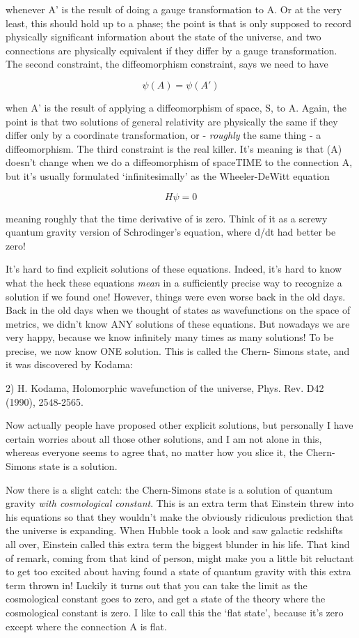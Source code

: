 whenever A' is the result of doing a gauge transformation to A.
Or at the very least, this should hold up to a phase; the point is
that \psi  is only supposed to record physically significant information
about the state of the universe, and two connections are physically
equivalent if they differ by a gauge transformation.  The second
constraint, the diffeomorphism constraint, says we need to have

$$
                     \psi (A) = \psi (A')
$$
    

when A' is the result of applying a diffeomorphism of space, S, to A.
Again, the point is that two solutions of general relativity are physically
the same if they differ only by a coordinate transformation, or -
\emph{roughly} the same thing - a diffeomorphism.   The third constraint
is the real killer.  It's meaning is that \psi (A) doesn't change when we do
a diffeomorphism of spaceTIME to the connection A, but it's usually
formulated `infinitesimally' as the Wheeler-DeWitt equation

$$
                        H \psi  = 0
$$
    

meaning roughly that the time derivative of \psi  is zero.  Think of it
as a screwy quantum gravity version of Schrodinger's equation, where
d\psi /dt had better be zero!

It's hard to find explicit solutions of these equations.  Indeed, it's
hard to know what the heck these equations \emph{mean} in a sufficiently
precise way to recognize a solution if we found one!  However, things 
were even worse back in the old days.  Back in the old days when we 
thought of states as wavefunctions on the space of metrics, we didn't 
know ANY solutions of these equations.  But nowadays we are very
happy, because we know infinitely many times as many solutions!
To be precise, we now know ONE solution.  This is called the Chern-
Simons state, and it was discovered by Kodama:

2) H. Kodama, Holomorphic wavefunction of the universe,
Phys. Rev. D42 (1990), 2548-2565.

Now actually people have proposed other explicit solutions, but
personally I have certain worries about all those other solutions,
and I am not alone in this, whereas everyone seems to agree that, no
matter how you slice it, the Chern-Simons state is a solution.

Now there is a slight catch: the Chern-Simons state is a solution
of quantum gravity \emph{with cosmological constant}.  This is an
extra term that Einstein threw into his equations so that they
wouldn't make the obviously ridiculous prediction that the universe
is expanding.  When Hubble took a look and saw galactic redshifts
all over, Einstein called this extra term the biggest blunder in his
life.  That kind of remark, coming from that kind of person, might
make you a little bit reluctant to get too excited about having found a 
state of quantum gravity with this extra term thrown in!  Luckily
it turns out that you can take the limit as the cosmological constant
goes to zero, and get a state of the theory where the cosmological
constant is zero.  I like to call this the `flat state', because it's zero
except where the connection A is flat.  

